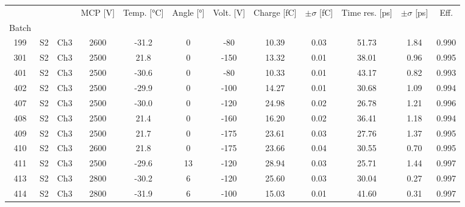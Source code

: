\begin{tabular}{cccccccccccc}
\toprule
 &  &  & MCP [V] & Temp. [°C] & Angle [°] & Volt. [V] & Charge [fC] & \(\pm\sigma\) [fC] & Time res. [ps] & \(\pm\sigma\) [ps] & Eff. \\
Batch &  &  &  &  &  &  &  &  &  &  &  \\
\midrule
199 & S2 & Ch3 & 2600 & -31.2 & 0 & -80 & 10.39 & 0.03 & 51.73 & 1.84 & 0.990 \\
301 & S2 & Ch3 & 2500 & 21.8 & 0 & -150 & 13.32 & 0.01 & 38.01 & 0.96 & 0.995 \\
401 & S2 & Ch3 & 2500 & -30.6 & 0 & -80 & 10.33 & 0.01 & 43.17 & 0.82 & 0.993 \\
402 & S2 & Ch3 & 2500 & -29.9 & 0 & -100 & 14.27 & 0.01 & 30.68 & 1.09 & 0.994 \\
407 & S2 & Ch3 & 2500 & -30.0 & 0 & -120 & 24.98 & 0.02 & 26.78 & 1.21 & 0.996 \\
408 & S2 & Ch3 & 2500 & 21.4 & 0 & -160 & 16.20 & 0.02 & 36.41 & 1.18 & 0.994 \\
409 & S2 & Ch3 & 2500 & 21.7 & 0 & -175 & 23.61 & 0.03 & 27.76 & 1.37 & 0.995 \\
410 & S2 & Ch3 & 2600 & 21.8 & 0 & -175 & 23.66 & 0.04 & 30.55 & 0.70 & 0.995 \\
411 & S2 & Ch3 & 2500 & -29.6 & 13 & -120 & 28.94 & 0.03 & 25.71 & 1.44 & 0.997 \\
413 & S2 & Ch3 & 2800 & -30.2 & 6 & -120 & 25.60 & 0.03 & 30.04 & 0.27 & 0.997 \\
414 & S2 & Ch3 & 2800 & -31.9 & 6 & -100 & 15.03 & 0.01 & 41.60 & 0.31 & 0.997 \\
\bottomrule
\end{tabular}
